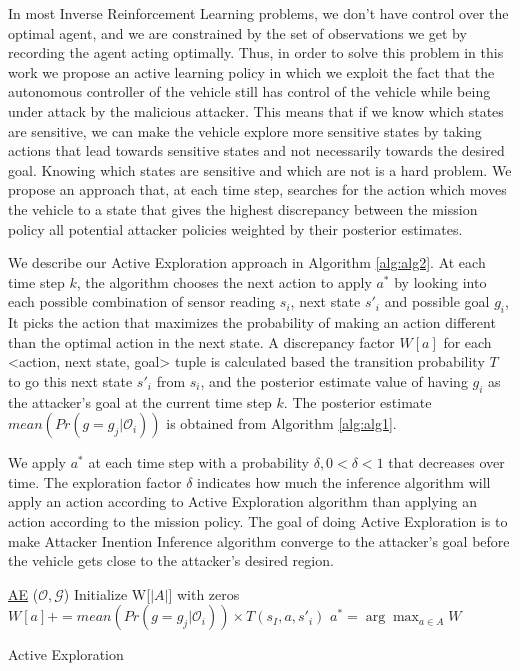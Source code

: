 \documentclass[letterpaper, 10 pt, conference]{ieeeconf}  %
\begin{document}
 In most Inverse Reinforcement Learning problems, we don't have control over the optimal agent, and we are constrained by the set of observations we get by recording the agent acting optimally. Thus, in order to solve this problem in this work we propose an active learning policy in which we exploit the fact that the autonomous controller of the vehicle still has control of the vehicle while being under attack by the malicious attacker. This means that if we know which states are sensitive, we can make the vehicle explore more sensitive states by taking actions that lead towards sensitive states and not necessarily towards the desired goal. Knowing which states are sensitive and which are not is a hard problem. We propose an approach that, at each time step, searches for the action which moves the vehicle to a state that gives the highest discrepancy between the mission policy all potential attacker policies weighted by their posterior estimates.

We describe our Active Exploration approach in Algorithm \ref{alg:alg2}. At each time step $k$, the algorithm chooses the next action to apply $a^*$ by looking into each possible combination of sensor reading $s_i$, next state $s'_i$ and possible goal $g_i$, It picks the action that maximizes the probability of making an action different than the optimal action in the next state. A discrepancy factor  $W[a]$ for each <action, next state, goal> tuple is calculated based the transition probability $T$ to go this next state $s'_i$ from $s_i$, and the posterior estimate value of having $g_i$ as the attacker's goal at the current time step $k$. The posterior estimate $mean(Pr(g=g_j|\mathcal{O}_i))$ is obtained from Algorithm \ref{alg:alg1}.

We apply $a^*$ at each time step with a probability $\delta, 0 < \delta < 1$ that decreases over time. The exploration factor $\delta$ indicates how much the inference algorithm will apply an action according to Active Exploration algorithm than applying an action according to the mission policy. The goal of doing Active Exploration is to make Attacker Inention Inference algorithm converge to the attacker's goal before the vehicle gets close to the attacker's desired region.
\begin{algorithm}\label{alg:alg2}
    \underline{AE} ($\mathcal{O}, \mathcal{G}$)\;
    Initialize W[$|A|$] with zeros\;
    {
        {
            {
                {
                    {
                       $W[a]+=mean(Pr(g=g_j|\mathcal{O}_i))\times T(s_I, a, s'_i)$\;
                    }
                }
            }
        }
    }
    $a^*=\arg\!\max_{a\in A}W$\;
    \caption{Active Exploration}
\end{algorithm}
\end{document}
